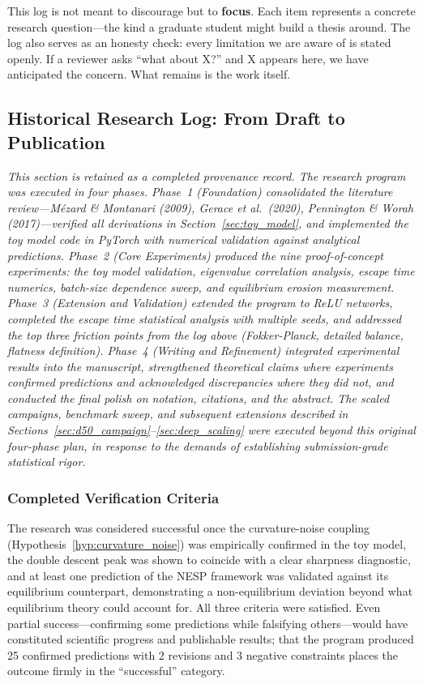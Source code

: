\documentclass[
  journal=largetwo,
  simfonts=false,
  year=2025,
  volume=37,
]{cup-journal}
\begin{document}
\begin{remark}
This log is not meant to discourage but to \textbf{focus}. Each item represents a concrete research question---the kind a graduate student might build a thesis around. The log also serves as an honesty check: every limitation we are aware of is stated openly. If a reviewer asks ``what about X?'' and X appears here, we have anticipated the concern. What remains is the work itself.
\end{remark}

\subsection{Historical Research Log: From Draft to Publication}\label{sec:roadmap}

\textit{This section is retained as a completed provenance record. The research program was executed in four phases. Phase~1 (Foundation) consolidated the literature review---M\'ezard \& Montanari (2009), Gerace et al.\ (2020), Pennington \& Worah (2017)---verified all derivations in Section~\ref{sec:toy_model}, and implemented the toy model code in PyTorch with numerical validation against analytical predictions. Phase~2 (Core Experiments) produced the nine proof-of-concept experiments: the toy model validation, eigenvalue correlation analysis, escape time numerics, batch-size dependence sweep, and equilibrium erosion measurement. Phase~3 (Extension and Validation) extended the program to ReLU networks, completed the escape time statistical analysis with multiple seeds, and addressed the top three friction points from the log above (Fokker-Planck, detailed balance, flatness definition). Phase~4 (Writing and Refinement) integrated experimental results into the manuscript, strengthened theoretical claims where experiments confirmed predictions and acknowledged discrepancies where they did not, and conducted the final polish on notation, citations, and the abstract. The scaled campaigns, benchmark sweep, and subsequent extensions described in Sections~\ref{sec:d50_campaign}--\ref{sec:deep_scaling} were executed beyond this original four-phase plan, in response to the demands of establishing submission-grade statistical rigor.}

\subsubsection{Completed Verification Criteria}

The research was considered successful once the curvature-noise coupling (Hypothesis~\ref{hyp:curvature_noise}) was empirically confirmed in the toy model, the double descent peak was shown to coincide with a clear sharpness diagnostic, and at least one prediction of the NESP framework was validated against its equilibrium counterpart, demonstrating a non-equilibrium deviation beyond what equilibrium theory could account for. All three criteria were satisfied. Even partial success---confirming some predictions while falsifying others---would have constituted scientific progress and publishable results; that the program produced 25 confirmed predictions with 2 revisions and 3 negative constraints places the outcome firmly in the ``successful'' category.
\end{document}
